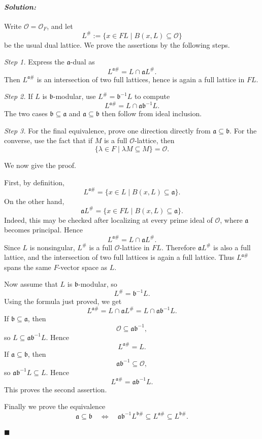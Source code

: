 \documentclass[12pt, a4paper]{article}
\newenvironment{solution}
  {\paragraph{\textit{Solution:}}\par\medskip}
  {\hfill$\blacksquare$\vspace{0.1cm}}
\begin{document}
\begin{solution}
Write \(\mathcal O=\mathcal O_F\), and let
\[
L^\#:=\{x\in F L\mid B(x,L)\subseteq \mathcal O\}
\]
be the usual dual lattice. We prove the assertions by the following steps.

\emph{Step 1.} Express the \(\mathfrak a\)-dual as
\[
L^{\mathfrak a\#}=L\cap \mathfrak a L^\#.
\]
Then \(L^{\mathfrak a\#}\) is an intersection of two full lattices, hence is
again a full lattice in \(F L\).

\emph{Step 2.} If \(L\) is \(\mathfrak b\)-modular, use
\(L^\#=\mathfrak b^{-1}L\) to compute
\[
L^{\mathfrak a\#}=L\cap \mathfrak a\mathfrak b^{-1}L.
\]
The two cases \(\mathfrak b\subseteq \mathfrak a\) and
\(\mathfrak a\subseteq \mathfrak b\) then follow from ideal inclusion.

\emph{Step 3.} For the final equivalence, prove one direction directly from
\(\mathfrak a\subseteq \mathfrak b\). For the converse, use the fact that if
\(M\) is a full \(\mathcal O\)-lattice, then
\[
\{\lambda\in F\mid \lambda M\subseteq M\}=\mathcal O.
\]

We now give the proof.

First, by definition,
\[
L^{\mathfrak a\#}
=
\{x\in L\mid B(x,L)\subseteq \mathfrak a\}.
\]
On the other hand,
\[
\mathfrak a L^\#
=
\{x\in F L\mid B(x,L)\subseteq \mathfrak a\}.
\]
Indeed, this may be checked after localizing at every prime ideal of
\(\mathcal O\), where \(\mathfrak a\) becomes principal. Hence
\[
L^{\mathfrak a\#}=L\cap \mathfrak a L^\#.
\]
Since \(L\) is nonsingular, \(L^\#\) is a full \(\mathcal O\)-lattice in
\(F L\). Therefore \(\mathfrak a L^\#\) is also a full lattice, and the
intersection of two full lattices is again a full lattice. Thus
\(L^{\mathfrak a\#}\) spans the same \(F\)-vector space as \(L\).

Now assume that \(L\) is \(\mathfrak b\)-modular, so
\[
L^\#=\mathfrak b^{-1}L.
\]
Using the formula just proved, we get
\[
L^{\mathfrak a\#}
=
L\cap \mathfrak a L^\#
=
L\cap \mathfrak a\mathfrak b^{-1}L.
\]
If \(\mathfrak b\subseteq \mathfrak a\), then
\[
\mathcal O\subseteq \mathfrak a\mathfrak b^{-1},
\]
so \(L\subseteq \mathfrak a\mathfrak b^{-1}L\). Hence
\[
L^{\mathfrak a\#}=L.
\]
If \(\mathfrak a\subseteq \mathfrak b\), then
\[
\mathfrak a\mathfrak b^{-1}\subseteq \mathcal O,
\]
so \(\mathfrak a\mathfrak b^{-1}L\subseteq L\). Hence
\[
L^{\mathfrak a\#}=\mathfrak a\mathfrak b^{-1}L.
\]
This proves the second assertion.

Finally we prove the equivalence
\[
\mathfrak a\subseteq \mathfrak b
\quad\Longleftrightarrow\quad
\mathfrak a\mathfrak b^{-1}L^{\mathfrak b\#}
\subseteq
L^{\mathfrak a\#}
\subseteq
L^{\mathfrak b\#}.
\]


\end{solution}
\end{document}

